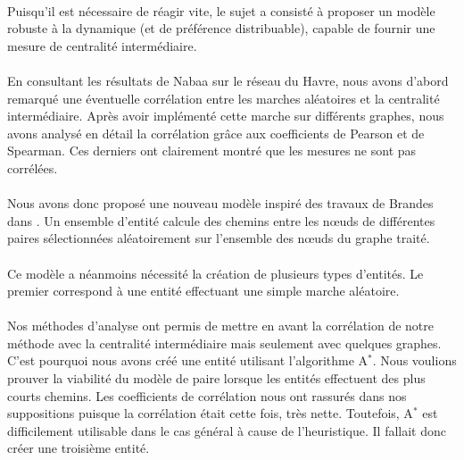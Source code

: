 \documentclass[a4paper, 10pt]{report}
\begin{document}
\paragraph{}Puisqu'il est nécessaire de réagir vite, le sujet a consisté à proposer un modèle robuste à la dynamique (et de préférence distribuable), capable de fournir une mesure de centralité intermédiaire.

\paragraph{}En consultant les résultats de Nabaa sur le réseau du Havre, nous avons d'abord remarqué une éventuelle corrélation entre les marches aléatoires et la centralité intermédiaire. Après avoir implémenté cette marche sur différents graphes, nous avons analysé en détail la corrélation grâce aux coefficients de Pearson et de Spearman. Ces derniers ont clairement montré que les mesures ne sont pas corrélées.

\paragraph{}Nous avons donc proposé une nouveau modèle inspiré des travaux de Brandes dans \cite{Brandes2007Centrality}. Un ensemble d'entité calcule des chemins entre les n\oe uds de différentes paires sélectionnées aléatoirement sur l'ensemble des n\oe uds du graphe traité.

\paragraph{}Ce modèle a néanmoins nécessité la création de plusieurs types d'entités. Le premier correspond à une entité effectuant une simple marche aléatoire. 

\paragraph{}Nos méthodes d'analyse ont permis de mettre en avant la corrélation de notre méthode avec la centralité intermédiaire mais seulement avec quelques graphes. C'est pourquoi nous avons créé une entité utilisant l'algorithme A$^*$. Nous voulions prouver la viabilité du modèle de paire lorsque les entités effectuent des plus courts chemins. Les coefficients de corrélation nous ont rassurés dans nos suppositions puisque la corrélation était cette fois, très nette. Toutefois, A$^*$ est difficilement utilisable dans le cas général à cause de l'heuristique. Il fallait donc créer une troisième entité.
\end{document}
